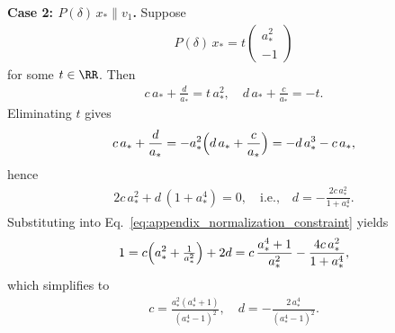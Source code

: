\documentclass{article}
\begin{document}
\textbf{Case 2: $P(\delta)\, x_* \parallel v_1$.}
Suppose
\begin{align}
    P(\delta)\, x_* = t \begin{pmatrix} a_*^2 \\ -1 \end{pmatrix}
\end{align}
for some $t \in \RR$. Then
\begin{align}
    c\, a_* + \frac{d}{a_*} = t\, a_*^2,
    \quad
    d\, a_* + \frac{c}{a_*} = -t.
\end{align}
Eliminating $t$ gives
\begin{align}
    c\, a_* + \frac{d}{a_*}
    = -a_*^2\Bigl(d\, a_* + \frac{c}{a_*}\Bigr)
    = -d\, a_*^3 - c\, a_*,
\end{align}
hence
\begin{align}
    2c\, a_*^2 + d\, (1 + a_*^4) = 0, \quad\text{i.e.,}\quad
    d = -\frac{2c\, a_*^2}{1 + a_*^4}.
    \label{eq:appendix_d_in_terms_of_c}
\end{align}
Substituting into
Eq.~\eqref{eq:appendix_normalization_constraint} yields
\begin{align}
    1
    = c\Bigl(a_*^2 + \tfrac{1}{a_*^2}\Bigr) + 2d
    = c\,\frac{a_*^4 + 1}{a_*^2}
      - \frac{4c\, a_*^2}{1 + a_*^4},
\end{align}
which simplifies to
\begin{align}
    c = \frac{a_*^2(a_*^4 + 1)}{(a_*^4 - 1)^2},
    \quad
    d = -\frac{2\, a_*^4}{(a_*^4 - 1)^2}.
    \label{eq:appendix_c_d_from_astar}
\end{align}
\end{document}
